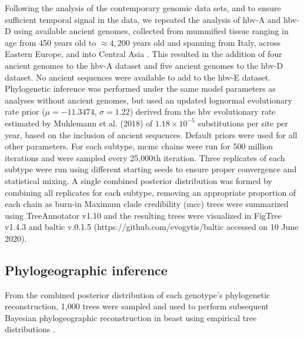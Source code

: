 Following the analysis of the contemporary genomic data sets, and to ensure sufficient temporal signal in the data, we repeated the analysis of \gls{hbv}-A and \gls{hbv}-D using available ancient genomes, collected from mummified tissue ranging in age from 450 years old to $\approx4,200$ years old and spanning from Italy, across Eastern Europe, and into Central Asia \citep{ross2018paradox,muhlemann2018ancient}.
This resulted in the addition of four ancient genomes to the \gls{hbv}-A dataset and five ancient genomes to the \gls{hbv}-D dataset.
No ancient sequences were available to add to the \gls{hbv}-E dataset.
Phylogenetic inference was performed under the same model parameters as analyses without ancient genomes, but used an updated lognormal evolutionary rate prior ($\mu=-11.3474$, $\sigma=1.22$) derived from the \gls{hbv} evolutionary rate estimated by Muhlemann et al. (2018) of $1.18 \times 10^{-5}$ substitutions per site per year, based on the inclusion of ancient sequences.
Default priors were used for all other parameters.
For each subtype, \gls{mcmc} chains were run for 500 million iterations and were sampled every 25,000th iteration.
Three replicates of each subtype were run using different starting seeds to ensure proper convergence and statistical mixing.
A single combined posterior distribution was formed by combining all replicates for each subtype, removing an appropriate proportion of each chain as burn-in
Maximum clade credibility (\gls{mcc}) trees were summarized using TreeAnnotator v1.10 \citep{suchard2018bayesian} and the resulting trees were visualized in FigTree v1.4.3 and baltic v.0.1.5 (https://github.com/evogytis/baltic accessed on 10 June 2020).

\subsection{Phylogeographic inference}
From the combined posterior distribution of each genotype's phylogenetic reconstruction, 1,000 trees were sampled and used to perform subsequent Bayesian phylogeographic reconstruction in \gls{beast} using empirical tree distributions \citep{pagel2004bayesian}.

